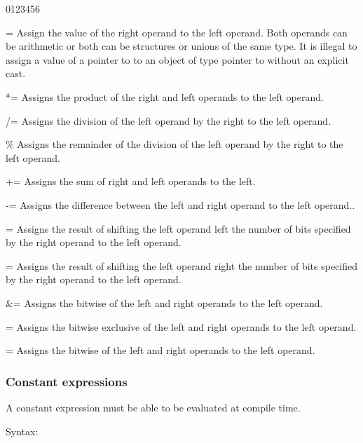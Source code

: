 \begin{production}
\begin{Ventry3}{0123456}
\item[=]   
Assign the value of the right operand to the left operand.  Both
operands can be arithmetic or both can be structures or unions of the
same type. It is illegal to assign a value of a pointer to
 to an object of type pointer to  without an 
explicit cast.

\item[*=]  
Assigns the product of the right and left operands to the left operand.
\item[/=]  
Assigns the division of the left operand by the right to the left operand.  
\item[\%]  
Assigns the remainder of the division of the left operand by the right
to the left operand.
\item[+=] 
Assigns the sum of right and left operands to the left. 
\item[-=] 
Assigns the difference between the left and right operand to
the left operand..
\item[\leftshift =] 
Assigns the result of shifting the left operand left the number of
bits specified by the right operand to the left operand.
\item[\rightshift=]
Assigns the result of shifting the left operand right the number of
bits specified by the right operand to the left operand.
\item[\&=] 
Assigns the bitwise  of the left and right operands to
the left operand.
 
\item[\circumflex =]
Assigns the bitwise exclusive  of the left and right operands to
the left operand.
\item[\T{|}=] 
Assigns the bitwise  of the left and right operands to
the left operand.
\end{Ventry3}
\end{production}
 



\subsubsection{Constant expressions}
\label{sec:ConstantExpression}

A constant expression must be able to be evaluated at compile time. 

Syntax:

